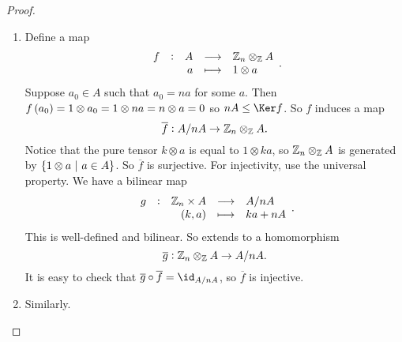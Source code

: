 \begin{proof}
\hfill
\begin{enumerate}
\item Define a map
$$ \function[f]{A}{\ZZ_n \otimes_\ZZ A}{a}{1 \otimes a}. $$
Suppose $ a_0 \in A $ such that $ a_0 = na $ for some $ a $. Then $ f\br{a_0} = 1 \otimes a_0 = 1 \otimes na = n \otimes a = 0 $ so $ nA \le \Ker f $. So $ f $ induces a map
$$ \overline{f} : A / nA \to \mathbb{Z}_n \otimes_{\mathbb{Z}} A. $$
Notice that the pure tensor $ k \otimes a $ is equal to $ 1 \otimes ka $, so $ \mathbb{Z}_n \otimes_{\mathbb{Z}} A $ is generated by $ \cbr{1 \otimes a \st a \in A} $. So $ \overline{f} $ is surjective. For injectivity, use the universal property. We have a bilinear map
$$ \function[g]{\ZZ_n \times A}{A / nA}{\br{k, a}}{ka + nA}. $$
This is well-defined and bilinear. So extends to a homomorphism
$$ \overline{g} : \mathbb{Z}_n \otimes_{\mathbb{Z}} A \to A / nA. $$
It is easy to check that $ \overline{g} \circ \overline{f} = \id_{A / nA} $, so $ \overline{f} $ is injective.
\item Similarly.
\end{enumerate}
\end{proof}

